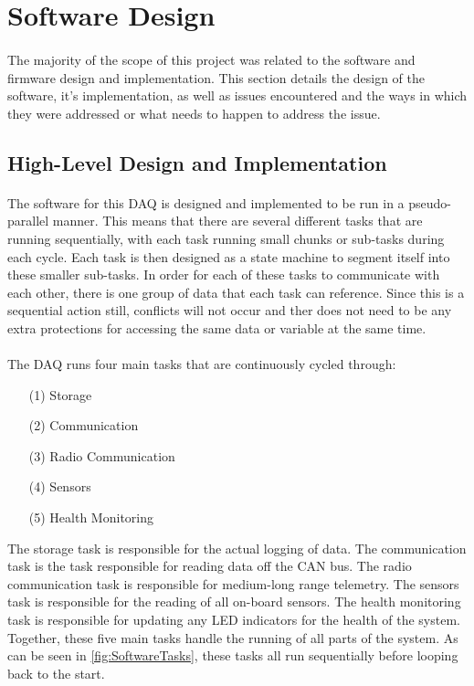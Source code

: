 \section{Software Design}

\paragraph{}
The majority of the scope of this project was related to the software and firmware design and implementation.
This section details the design of the software, it's implementation, as well as issues encountered and the ways in which they were addressed or what needs to happen to address the issue.

\subsection{High-Level Design and Implementation}

\paragraph{}
The software for this DAQ is designed and implemented to be run in a pseudo-parallel manner.
This means that there are several different tasks that are running sequentially, with each task running small chunks or sub-tasks during each cycle.
Each task is then designed as a state machine to segment itself into these smaller sub-tasks.
In order for each of these tasks to communicate with each other, there is one group of data that each task can reference.
Since this is a sequential action still, conflicts will not occur and ther does not need to be any extra protections for accessing the same data or variable at the same time.

\paragraph{}
The DAQ runs four main tasks that are continuously cycled through:
\begin{itemize}
	\item[(1)] Storage
	\item[(2)] Communication
	\item[(3)] Radio Communication
	\item[(4)] Sensors
	\item[(5)] Health Monitoring
\end{itemize}
The storage task is responsible for the actual logging of data.
The communication task is the task responsible for reading data off the CAN bus.
The radio communication task is responsible for medium-long range telemetry.
The sensors task is responsible for the reading of all on-board sensors.
The health monitoring task is responsible for updating any LED indicators for the health of the system.
Together, these five main tasks handle the running of all parts of the system.
As can be seen in \cref{fig:SoftwareTasks}, these tasks all run sequentially before looping back to the start.

